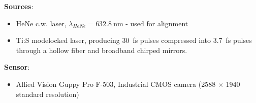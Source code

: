 \documentclass[11pt]{beamer}
\begin{document}
\begin{frame}
\textbf{Sources}:\\
\begin{itemize}
	\item HeNe c.w. laser, $\lambda_{HeNe} = \SI{632.8}{\nm}$ - used for alignment
	\item Ti:S modelocked laser, producing \SI{30}{\fs} pulses compressed into \SI{3.7}{\fs} pulses through a hollow fiber and broadband chirped mirrors.
\end{itemize}
	
\textbf{Sensor}:\\
\begin{itemize}
	\item Allied Vision Guppy Pro F-503, Industrial CMOS camera (2588 $\times$ 1940 standard resolution)
\end{itemize}

\end{frame}
\end{document}
